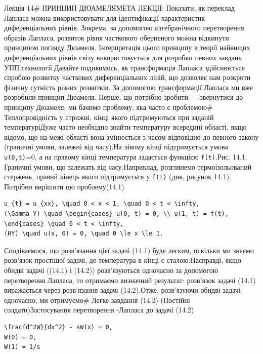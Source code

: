 \documentclass[
  ukrainian,
]{article}
\begin{document}
Лекція 14\# ПРИНЦИП ДЮАМЕЛЯМЕТА ЛЕКЦІЇ: Показати, як переклад Лапласа
можна використовувати для ідентифікації характеристик диференціальних
рівнів. Зокрема, за допомогою алгебранічного перетворення образів
Лапласа, розвиток рівня часткового оберненого можна відкинути принципом
погляду Дюамеля. Інтерпретація цього принципу в теорії найвищих
диференціальних рівнів світу використовується для розробки певних
завдань УПП.технології.Давайте подивимось, як трансформація Лапласа
здійснюється спробою розвитку часткових диференціальних ліній, що
дозволяє нам розкрити фізичну сутність різних розвитків. За допомогою
трансформації Лапласа ми вже розробили принцип Дюамеля. Перше, що
потрібно зробити --- звернутися до принципу Дюамеля, ми бачимо проблему,
яка часто є проблемою\# Теплопровідність у стрижні, кінці якого
підтримуються при заданій температуріДуже часто необхідно знайти
температуру всередині області, якщо відомо, що на межі області вона
змінюється з часом відповідно до певного закону (граничні умови, залежні
від часу).На лівому кінці підтримується умова \texttt{u(0,t)}=0, а на
правому кінці температура задається функцією \texttt{f(t)}.Рис. 14.1.
Граничні умови, що залежать від часу.Наприклад, розглянемо
термоізольований стержень, правий кінець якого підтримується у
\texttt{f(t)} (див. рисунок 14.1). Потрібно вирішити цю проблему(14.1)

\begin{verbatim}
u_{t} = u_{xx}, \quad 0 < x < 1, \quad 0 < t < \infty,
(\Gamma Y) \quad \begin{cases} u(0, t) = 0, \\ u(1, t) = f(t), \end{cases} \quad 0 < t < \infty,
(HY) \quad u(x, 0) = 0, \quad 0 \le x \le 1.
\end{verbatim}

Сподіваємося, що розв'язання цієї задачі (14.1) буде легким, оскільки ми
знаємо розв'язок простішої задачі, де температура в кінці є
сталою:Насправді, якщо обидві задачі ((14.1) і (14.2)) розв'язуються
одночасно за допомогою перетворення Лапласа, то отримаємо визначний
результат: розв'язок задачі (14.1) виражається через розв'язання задачі
(14.2).Отже, розв'язуючи обидві задачі одночасно, ми отримуємо\# Легке
завдання (14.2) (Постійні солдати)Застосування перетворення -Лапласа до
задачі (14.2)

\begin{verbatim}
\frac{d^2W}{dx^2} - sW(x) = 0,
W(0) = 0,
W(1) = 1/s
\end{verbatim}
\end{document}
